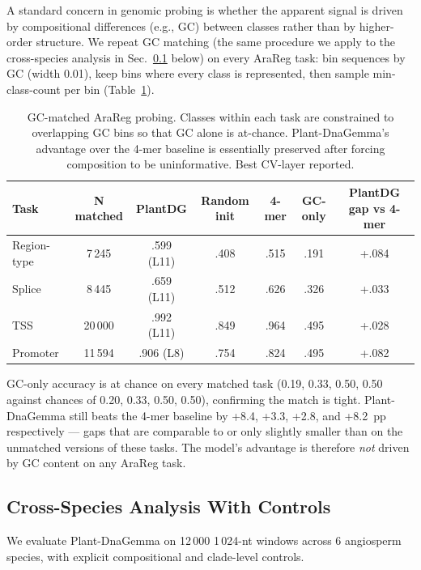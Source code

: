 \documentclass{article}
\begin{document}
A standard concern in genomic probing is whether the apparent signal is
driven by compositional differences (e.g., GC) between classes rather
than by higher-order structure. We repeat GC matching (the same procedure
we apply to the cross-species analysis in Sec.~\ref{sec:species} below) on
every AraReg task: bin sequences by GC (width 0.01), keep bins where every
class is represented, then sample min-class-count per bin
(Table~\ref{tab:arareg-gc-matched}).

\begin{table}[t]
\centering
\small
\caption{GC-matched AraReg probing. Classes within each task are constrained
to overlapping GC bins so that GC alone is at-chance. Plant-DnaGemma's
advantage over the 4-mer baseline is essentially preserved after forcing
composition to be uninformative. Best CV-layer reported.}
\label{tab:arareg-gc-matched}
\begin{tabular}{lcccccc}
\toprule
Task & N matched & PlantDG & Random init & 4-mer & GC-only & PlantDG gap vs 4-mer \\
\midrule
Region-type & 7\,245  & .599 (L11) & .408 & .515 & .191 & +.084 \\
Splice      & 8\,445  & .659 (L11) & .512 & .626 & .326 & +.033 \\
TSS         & 20\,000 & .992 (L11) & .849 & .964 & .495 & +.028 \\
Promoter    & 11\,594 & .906 (L8)  & .754 & .824 & .495 & +.082 \\
\bottomrule
\end{tabular}
\end{table}

GC-only accuracy is at chance on every matched task (0.19, 0.33, 0.50, 0.50
against chances of 0.20, 0.33, 0.50, 0.50), confirming the match is tight.
Plant-DnaGemma still beats the 4-mer baseline by +8.4, +3.3, +2.8, and +8.2~pp
respectively --- gaps that are comparable to or only slightly smaller than on
the unmatched versions of these tasks. The model's advantage is therefore
\emph{not} driven by GC content on any AraReg task.

\subsection{Cross-Species Analysis With Controls}
\label{sec:species}

We evaluate Plant-DnaGemma on 12\,000 1\,024-nt windows across 6 angiosperm
species, with explicit compositional and clade-level controls.
\end{document}
